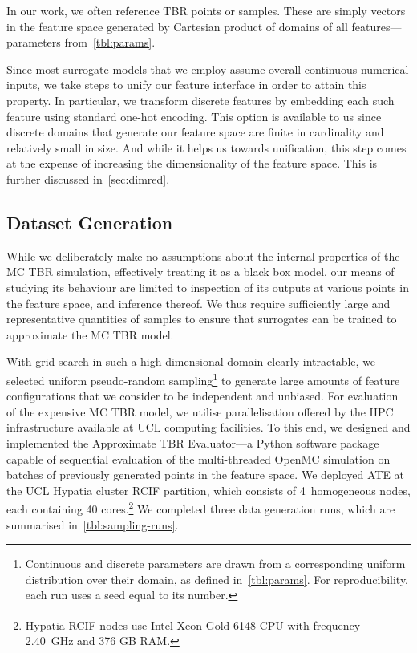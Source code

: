 In our work, we often reference TBR points or samples. These are simply vectors
in the feature space generated by Cartesian product of domains of all
features---parameters from~\cref{tbl:params}.

Since most surrogate models
that we employ assume overall continuous numerical inputs, we take steps to unify our
feature interface in order to attain this property. In particular, we transform
discrete features by embedding each such feature using standard one-hot
encoding. This option is available to
us since discrete domains that generate our feature space are finite in
cardinality and relatively small in size. And while it helps us towards
unification, this step comes at the expense of increasing the dimensionality of the
feature space. This is further discussed in~\cref{sec:dimred}.


\subsection{Dataset Generation}
\label{sec:dataset-generation}

While we deliberately make no assumptions about the internal properties of the
MC TBR simulation, effectively treating it as a black box model, our means of
studying its behaviour are limited to inspection of its outputs at various
points in the feature space, and inference thereof. We thus require
sufficiently large and representative quantities of samples to ensure that
surrogates can be trained to approximate the MC TBR model.

With grid search in such a high-dimensional domain clearly intractable, we
selected uniform pseudo-random sampling\footnote{Continuous and discrete
parameters are drawn from a corresponding uniform distribution over their
domain, as defined in~\cref{tbl:params}. For reproducibility, each run uses a seed equal to its number.} to generate large amounts of feature
configurations that we consider to be independent and unbiased. For evaluation
of the expensive MC TBR model, we utilise parallelisation offered by
the HPC infrastructure available at UCL computing facilities. To this end, we
designed and implemented the Approximate TBR Evaluator---a Python software package capable of
sequential evaluation of the multi-threaded OpenMC simulation on batches of
previously generated points in the feature space.
We deployed ATE at the UCL Hypatia cluster RCIF partition, which consists of
4~homogeneous nodes, each containing 40 cores.\footnote{Hypatia RCIF nodes use
Intel\textsuperscript{\textregistered} Xeon\textsuperscript{\textregistered}
Gold 6148 CPU with frequency 2.40~GHz and 376 GB RAM.} We completed three data
generation runs, which are summarised in~\cref{tbl:sampling-runs}.

